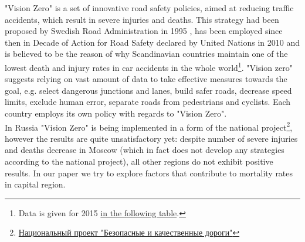 "Vision Zero" is a set of innovative road safety policies, aimed at reducing traffic accidents, which result in severe injuries and deaths.
This strategy had been proposed by Swedish Road Administration in 1995 \cite{Vision0}, has been employed since then in Decade of Action for
Road Safety declared by United Nations in 2010 \cite{Vision0} and is believed to be the reason of why Scandinavian countries maintain one of the lowest
death and injury rates in car accidents in the whole world\footnote{Data is given for 2015
\href{https://www.who.int/violence_injury_prevention/road_safety_status/2015/TableA2.pdf?ua=1}{in the following table}.}.
"Vision zero" suggests relying on vast amount of data to take effective measures towards the goal,
e.g. select dangerous junctions and lanes, build safer roads, decrease speed limits, exclude human error,
separate roads from pedestrians and cyclists. Each country employs its own policy with regards to "Vision Zero". \\
In Russia "Vision Zero" is being implemented in a form of the national project\footnote{
\href{https://bkdrf.ru/}{Национальный проект "Безопасные и качественные дороги"}}, however the results are quite unsatisfactory yet:
despite number of severe injuries and deaths decrease in Moscow (which in fact does not develop any strategies according to the national project),
all other regions do not exhibit positive results. In our paper we try to explore factors that contribute to mortality rates in capital region.
